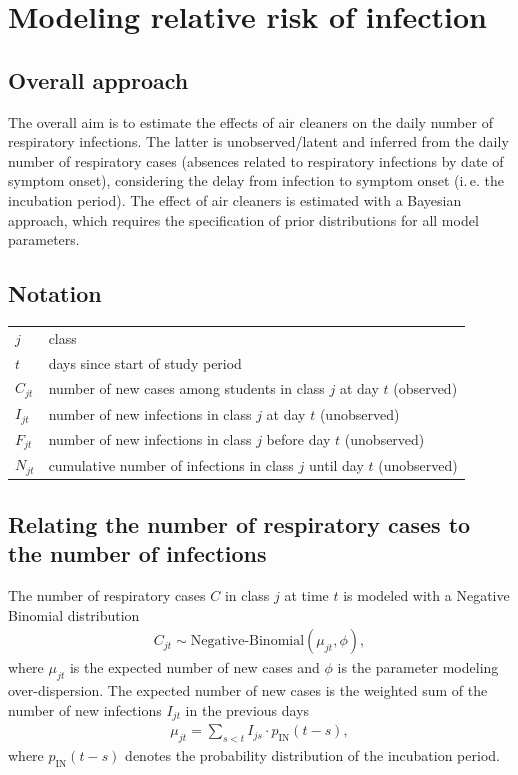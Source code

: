 \documentclass[fleqn,11pt]{wlscirep_supp}
\newcommand\ie{i.\,e.\xspace}
\begin{document}
\clearpage

\section{Modeling relative risk of infection}\label{sec:transmission-model}

\subsection{Overall approach}

The overall aim is to estimate the effects of air cleaners on the daily number of respiratory infections. The latter is unobserved/latent and inferred from the daily number of respiratory cases (absences related to respiratory infections by date of symptom onset), considering the delay from infection to symptom onset (\ie the incubation period). The effect of air cleaners is estimated with a Bayesian approach, which requires the specification of prior distributions for all model parameters.


\subsection{Notation}

\begin{tabular}{ll} 
$j$  & class \\
$t$ & days since start of study period \\
$C_{jt}$  & number of  new cases among students in class $j$ at day $t$ (observed) \\
$I_{jt}$  & number of new infections in class $j$ at day $t$ (unobserved)  \\
$F_{jt}$  & number of new infections in class $j$ before day $t$ (unobserved)  \\
$N_{jt}$  & cumulative number of infections in class $j$ until day $t$ (unobserved)  \\
\end{tabular}  

\subsection{Relating the number of respiratory cases to the number of infections}

The number of respiratory cases $C$ in class $j$ at time $t$ is modeled with a Negative Binomial distribution   
\begin{align*}
    C_{jt} \sim \text{Negative-Binomial}(\mu_{jt},\phi),
\end{align*}
where $\mu_{jt}$ is the expected number of new cases and $\phi$ is the parameter modeling over-dispersion. The expected number of new cases is the weighted sum of the number of new infections $I_{jt}$ in the  previous days
\begin{align*}
    \mu_{jt} = \sum_{s<t}I_{js} \cdot p_{\text{IN}}(t-s),
\end{align*}
where $p_{\text{IN}}(t-s)$ denotes the probability distribution of the incubation period. 
\end{document}
